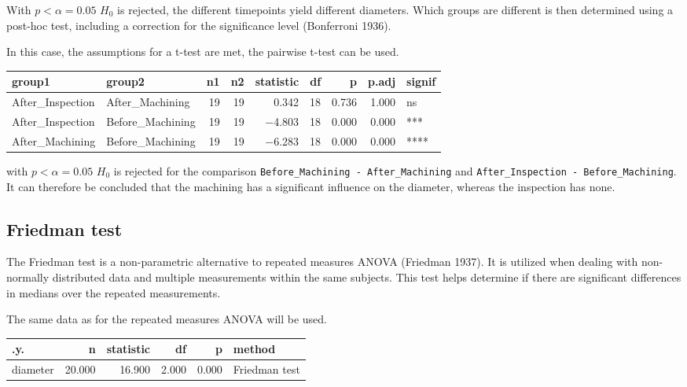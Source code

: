 \documentclass[
  a4paper,
]{scrbook}
\begin{document}
With \(p<\alpha = 0.05\) \(H_0\) is rejected, the different timepoints
yield different diameters. Which groups are different is then determined
using a post-hoc test, including a correction for the significance level
(Bonferroni 1936).

In this case, the assumptions for a t-test are met, the pairwise t-test
can be used.

\begin{longtable}[]{@{}llrrrrrrl@{}}
\toprule\noalign{}
group1 & group2 & n1 & n2 & statistic & df & p & p.adj & signif \\
\midrule\noalign{}
\endhead
\bottomrule\noalign{}
\endlastfoot
After\_Inspection & After\_Machining & 19 & 19 & 0.342 & 18 & 0.736 &
1.000 & ns \\
After\_Inspection & Before\_Machining & 19 & 19 & −4.803 & 18 & 0.000 &
0.000 & *** \\
After\_Machining & Before\_Machining & 19 & 19 & −6.283 & 18 & 0.000 &
0.000 & **** \\
\end{longtable}

with \(p<\alpha = 0.05\) \(H_0\) is rejected for the comparison
\texttt{Before\_Machining\ -\ After\_Machining} and
\texttt{After\_Inspection\ -\ Before\_Machining}. It can therefore be
concluded that the machining has a significant influence on the
diameter, whereas the inspection has none.

\subsection{Friedman test}\label{friedman-test}

The Friedman test is a non-parametric alternative to repeated measures
ANOVA (Friedman 1937). It is utilized when dealing with non-normally
distributed data and multiple measurements within the same subjects.
This test helps determine if there are significant differences in
medians over the repeated measurements.

The same data as for the repeated measures ANOVA will be used.

\begin{longtable}[]{@{}lrrrrl@{}}
\toprule\noalign{}
.y. & n & statistic & df & p & method \\
\midrule\noalign{}
\endhead
\bottomrule\noalign{}
\endlastfoot
diameter & 20.000 & 16.900 & 2.000 & 0.000 & Friedman test \\
\end{longtable}
\end{document}
